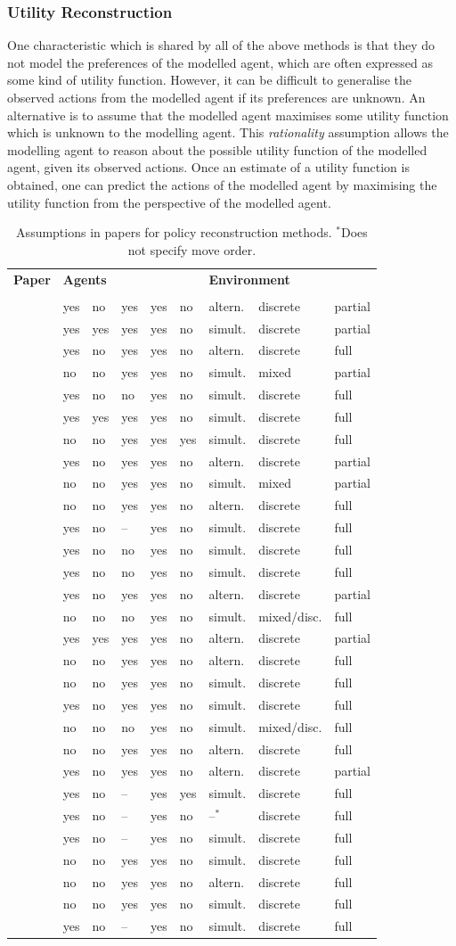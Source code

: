 \documentclass[final,1p,times,authoryear]{elsarticle}
\makeatletter
\newcommand{\nil}{@{}}
\newcommand{\nl}{\newline}
\newcommand{\rbox}[2]{\rotatebox{45}{\parbox{#1\textwidth}{#2}}}
\newcommand{\btab}{
	\center
	\scriptsize
	\bgroup\def\arraystretch{1.2}
	\begin{tabular}{\nil p{0.32\textwidth} @{\hspace{11pt}} l \nil l \nil l \nil l \nil l \nil l \nil l \nil l \nil}
		\toprule
		\bf Paper	& \multicolumn{5}{l}{\hspace{-5pt}\bf Agents} & \multicolumn{3}{l}{\hspace{-5pt}\bf Environment} \\[-5pt]
				& \rbox{0.075}{Stochastic \nl actions?} & \rbox{0.075}{Changing \nl behaviour?} & \rbox{0.075}{Factors \nl known?} & \rbox{0.07}{Independent \nl agents?} & \rbox{0.06}{Common \nl goals?} & \rbox{0.10}{Move order} & \rbox{0.11}{State/action \nl representation} & \rbox{0.09}{State/action \nl observability} \\
		\midrule}
\newcommand{\tabrow}[9]{\citep{#1} & #2 & #3 & #4 & #5 & #6 & #7 & #8 & #9 \\}
\newcommand{\etab}{
		\bottomrule
	\end{tabular}
	\egroup}
\newcommand{\si}{simult.}
\newcommand{\al}{altern.}
\newcommand{\as}{$^{*}$}
\makeatother
\begin{document}
		\subsubsection{Utility Reconstruction} \label{sec:policyrec-utility}

One characteristic which is shared by all of the above methods is that they do not model the preferences of the modelled agent, which are often expressed as some kind of utility function. However, it can be difficult to generalise the observed actions from the modelled agent if its preferences are unknown. An alternative is to assume that the modelled agent maximises some utility function which is unknown to the modelling agent. This \emph{rationality} assumption allows the modelling agent to reason about the possible utility function of the modelled agent, given its observed actions. Once an estimate of a utility function is obtained, one can predict the actions of the modelled agent by maximising the utility function from the perspective of the modelled agent.

\begin{table}[t]
	\btab
		\tabrow{ms2017}{yes}{no}{yes}{yes}{no}{\al}{discrete}{partial}
		\tabrow{pg2017}{yes}{yes}{yes}{yes}{no}{\si}{discrete}{partial}
		\tabrow{alphago2016}{yes}{no}{yes}{yes}{no}{\al}{discrete}{full}
		\tabrow{bkaa2015}{no}{no}{yes}{yes}{no}{\si}{mixed}{partial}
		\tabrow{cs2014,cs2013}{yes}{no}{no}{yes}{no}{\si}{discrete}{full}
		\tabrow{ar2013}{yes}{yes}{yes}{yes}{no}{\si}{discrete}{full}
		\tabrow{bskr2013}{no}{no}{yes}{yes}{yes}{\si}{discrete}{full}
		\tabrow{gs2011}{yes}{no}{yes}{yes}{no}{\al}{discrete}{partial}
		\tabrow{lasb2009}{no}{no}{yes}{yes}{no}{\si}{mixed}{partial}
		\tabrow{ht2008}{no}{no}{yes}{yes}{no}{\al}{discrete}{full}
		\tabrow{bs2007}{yes}{no}{--}{yes}{no}{\si}{discrete}{full}
		\tabrow{ps2005}{yes}{no}{no}{yes}{no}{\si}{discrete}{full}
		\tabrow{jbgs2005}{yes}{no}{no}{yes}{no}{\si}{discrete}{full}
		\tabrow{sbl2005}{yes}{no}{yes}{yes}{no}{\al}{discrete}{partial}
		\tabrow{s2005,s2004moo}{no}{no}{no}{yes}{no}{\si}{mixed/disc.}{full}
		\tabrow{bdsb2004}{yes}{yes}{yes}{yes}{no}{\al}{discrete}{partial}
		\tabrow{cj2004}{no}{no}{yes}{yes}{no}{\al}{discrete}{full}
		\tabrow{dh2004}{no}{no}{yes}{yes}{no}{\si}{discrete}{full}
		\tabrow{gpmg2004}{yes}{no}{yes}{yes}{no}{\si}{discrete}{full}
		\tabrow{aln2003}{no}{no}{no}{yes}{no}{\si}{mixed/disc.}{full}
		\tabrow{cko2001}{no}{no}{yes}{yes}{no}{\al}{discrete}{full}
		\tabrow{dbss2000}{yes}{no}{yes}{yes}{no}{\al}{discrete}{partial}
		\tabrow{cb1998}{yes}{no}{--}{yes}{yes}{\si}{discrete}{full}
		\tabrow{dh1998}{yes}{no}{--}{yes}{no}{--\as}{discrete}{full}
		\tabrow{sa1997}{yes}{no}{--}{yes}{no}{\si}{discrete}{full}
		\tabrow{cm1998dfa,cm1996dfa}{no}{no}{yes}{yes}{no}{\si}{discrete}{full}
		\tabrow{cm1996search93,cm1993search}{no}{no}{yes}{yes}{no}{\al}{discrete}{full}
		\tabrow{mgr1995}{no}{no}{yes}{yes}{no}{\si}{discrete}{full}
		\tabrow{b1951}{yes}{no}{--}{yes}{no}{\si}{discrete}{full}
	\etab
	\caption{Assumptions in papers for policy reconstruction methods. \as Does not specify move order.}
	\label{tab:policyrec}
\end{table}
\end{document}
